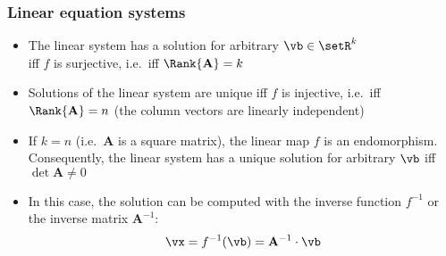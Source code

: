 \begin{frame}
  \frametitle{Linear equation systems}

  \begin{itemize}
  \item The linear system has a solution for arbitrary $\vb\in \setR^k$\\
    iff $f$ is surjective, i.e.\ iff $\Rank{\mathbf{A}} = k$%
    \pause
  \item Solutions of the linear system are unique iff $f$ is injective, i.e.\
    iff $\Rank{\mathbf{A}} = n$ (the column vectors are linearly independent)%
    \pause
  \item If $k=n$ (i.e.\ $\mathbf{A}$ is a square matrix), the linear map $f$ is an
    endomorphism.  Consequently, the linear system has a unique solution for
    arbitrary $\vb$ iff $\det \mathbf{A} \neq 0$%
    \pause
  \item In this case, the solution can be computed with the inverse function
    $f^{-1}$ or the inverse matrix $\mathbf{A}^{-1}$:
    \[
    \vx = f^{-1}(\vb) = \mathbf{A}^{-1}\cdot \vb
    \]
    \ungap[1.5]
    \begin{itemize}
    \end{itemize}
  \end{itemize}
\end{frame}

